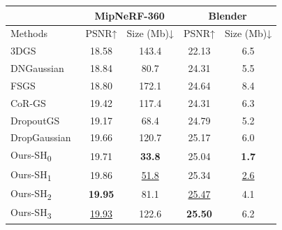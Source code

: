 \begin{tabular}{l|cc|cc}
\toprule
      & \multicolumn{2}{c|}{MipNeRF-360} & \multicolumn{2}{c}{Blender} \\
\midrule
Methods & PSNR↑ & Size (Mb)↓ & PSNR↑ & Size (Mb)↓ \\
\midrule
3DGS~\cite{kerbl2023-3dgs}  & 18.58 & 143.4 & 22.13 & 6.5 \\
DNGaussian~\cite{li2024dngaussian} & 18.84 & 80.7  & 24.31 & 5.5 \\
FSGS~\cite{zhu2024fsgs}  & 18.80  & 172.1 & 24.64 & 8.4 \\
CoR-GS~\cite{zhang2024corgs} & 19.42 & 117.4 & 24.31 & 6.3 \\
DropoutGS~\cite{xu2025Dropoutgs} & 19.17 & 68.4  & 24.79 & 5.2 \\
DropGaussian~\cite{park2025dropgaussian} & 19.66 & 120.7 & 25.17 & 6.0  \\
\midrule
Ours-SH\textsubscript{0} & 19.71 & \textbf{33.8} & 25.04 & \textbf{1.7} \\
Ours-SH\textsubscript{1} & 19.86 & \underline{51.8} & 25.34 & \underline{2.6} \\
Ours-SH\textsubscript{2} & \textbf{19.95} & 81.1  & \underline{25.47} & 4.1 \\
Ours-SH\textsubscript{3} & \underline{19.93} & 122.6 & \textbf{25.50 } & 6.2 \\
\bottomrule
\end{tabular}%
